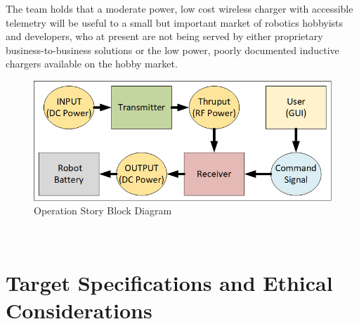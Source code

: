 \documentclass[12pt]{article}
\begin{document}
The team holds that a moderate power, low cost wireless charger with accessible telemetry will be useful to a small but important market of robotics hobbyists and developers, who at present are not being served by either proprietary business-to-business solutions or the low power, poorly documented inductive chargers available on the hobby market.\\
\hfill 
\begin{figure}[h!]
\centering
\includegraphics[width=0.84\linewidth]{black_box_power}
\caption{Operation Story Block Diagram}
\end{figure}
\hfill \\
\pagebreak
\section{Target Specifications and Ethical Considerations}
\end{document}
